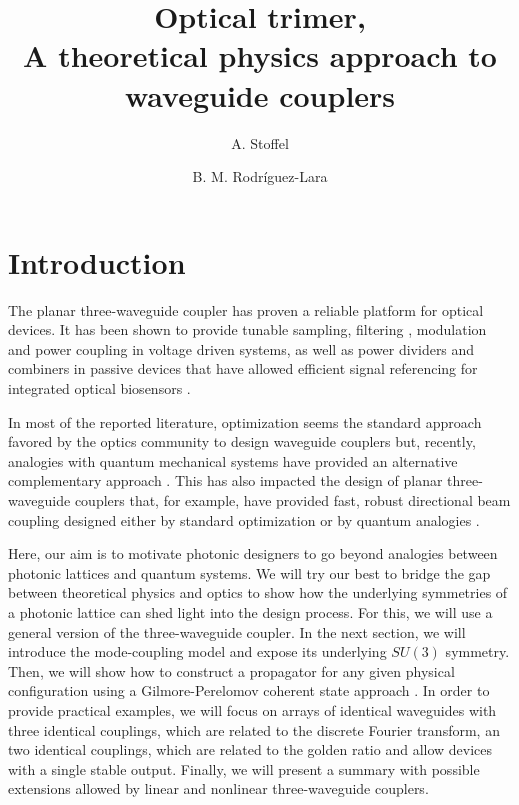 \documentclass[9pt,twocolumn,twoside]{osajnl}
\title{Optical trimer, \\ A theoretical physics approach to waveguide couplers}
\author[1]{A. Stoffel}
\author[1,*]{B. M. Rodríguez-Lara}
\affil[1]{Instituto Nacional de Astrof\'{\i}sica, \'Optica y Electr\'onica, Calle Luis Enrique Erro No. 1, Sta. Ma. Tonantzintla, Pue. CP 72840, M\'exico}
\affil[*]{Corresponding author: bmlara@inaoep.mx}
\begin{document}
\maketitle
\thispagestyle{fancy}

\section{Introduction}

The planar three-waveguide coupler \cite{Iwasaki1975p100} has proven a reliable platform for optical devices. 
It has been shown to provide tunable sampling, filtering \cite{Haus1981p2321},  modulation \cite{Donelly1985p18} and power coupling \cite{Charczenko1989p202} in voltage driven systems, as well as power dividers and combiners in passive devices \cite{Donelly1983p417,Donelly1986p610,Donelly1987p401,Kubo1989p1924} that have allowed efficient signal referencing for integrated optical biosensors \cite{Luff1998p583}.

In most of the reported literature, optimization seems the standard approach  favored by the optics community to design waveguide couplers \cite{Su1989p1666,Petrovic2015p139} but, recently, analogies with quantum mechanical systems have provided an alternative complementary approach \cite{PerezLeija2013p012309,PerezLeija2013p022303}. 
This has also impacted the design of planar three-waveguide couplers that, for example,  have provided fast, robust directional beam coupling designed either by standard optimization \cite{Ng1999p475,Schneider2001p129,Narevicius2005p3362} or by quantum analogies \cite{Paspalakis2006p30,Salandrino2009p4524,Tseng2013p2478,RodriguezLara2014p013802}.

Here, our aim is to motivate photonic designers to go beyond analogies between photonic lattices and quantum systems. 
We will try our best to bridge the gap between theoretical physics and optics to show how the underlying symmetries of a photonic lattice can shed light into the design process. 
For this, we will use a general version of the three-waveguide coupler.
In the next section, we will introduce the mode-coupling model and expose its underlying $SU(3)$ symmetry. 
Then, we will show how to construct a propagator for any given physical configuration using a Gilmore-Perelomov coherent state approach \cite{VillanuevaVergara2015p}.
In order to provide practical examples, we will focus on arrays of identical waveguides with three identical couplings, which are related to the discrete Fourier transform, an two identical couplings, which are related to the golden ratio and allow devices with a single stable output. 
Finally, we will present a summary with possible extensions allowed by linear and nonlinear three-waveguide couplers.
\end{document}
